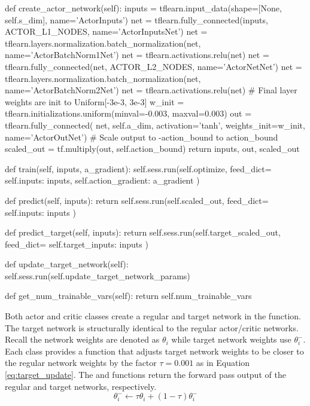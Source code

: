 \begin{python}[caption={Actor Network Class},label={list:actor_net}]
    def create_actor_network(self):
        inputs = tflearn.input_data(shape=[None, self.s_dim], name='ActorInputs')
        net = tflearn.fully_connected(inputs, ACTOR_L1_NODES, name='ActorInputsNet')
        net = tflearn.layers.normalization.batch_normalization(net, name='ActorBatchNorm1Net')
        net = tflearn.activations.relu(net)
        net = tflearn.fully_connected(net, ACTOR_L2_NODES, name='ActorNetNet')
        net = tflearn.layers.normalization.batch_normalization(net, name='ActorBatchNorm2Net')
        net = tflearn.activations.relu(net)
        # Final layer weights are init to Uniform[-3e-3, 3e-3]
        w_init = tflearn.initializations.uniform(minval=-0.003, maxval=0.003)
        out = tflearn.fully_connected(
            net, self.a_dim, activation='tanh', weights_init=w_init, name='ActorOutNet')
        # Scale output to -action_bound to action_bound
        scaled_out = tf.multiply(out, self.action_bound)
        return inputs, out, scaled_out

    def train(self, inputs, a_gradient):
        self.sess.run(self.optimize, feed_dict={
            self.inputs: inputs,
            self.action_gradient: a_gradient
        })

    def predict(self, inputs):
        return self.sess.run(self.scaled_out, feed_dict={
            self.inputs: inputs
        })

    def predict_target(self, inputs):
        return self.sess.run(self.target_scaled_out, feed_dict={
            self.target_inputs: inputs
        })

    def update_target_network(self):
        self.sess.run(self.update_target_network_params)

    def get_num_trainable_vars(self):
        return self.num_trainable_vars
\end{python}

Both actor and critic classes create a regular and target network in the  function. The target network is structurally identical to the regular actor/critic networks. Recall the network weights are denoted as $\theta_i$ while target network weights use $\theta^-_i$. Each class provides a function   that adjusts target network weights to be closer to the regular network weights by the factor $\tau=0.001$ as in Equation \ref{eq:target_update}. The  and  functions return the forward pass output of the regular and target networks, respectively.
\begin{equation}
\label{eq:target_update}
\theta^-_i \gets \tau\theta_i + (1-\tau)\theta^-_i
\end{equation}

